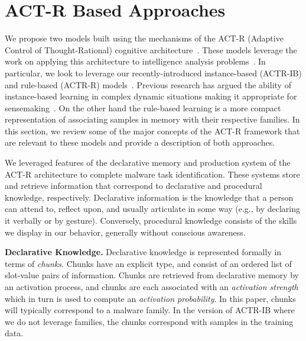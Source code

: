 \documentclass[conference]{IEEEtran}
\begin{document}
\section{ACT-R Based Approaches}
\label{apprSec}

We propose two models built using the mechanisms of the ACT-R (Adaptive Control of Thought-Rational) cognitive architecture~\cite{Anderson04anintegrated}.  These models leverage the work on applying this architecture to intelligence analysis problems~\cite{Lebiere:2013}.  In particular, we look to leverage our recently-introduced instance-based (ACTR-IB) and rule-based (ACTR-R) models~\cite{iccm:2015,brims}.  Previous research has argued the ability of instance-based learning in complex dynamic situations making it appropriate for sensemaking~\cite{Gonzalez2003591}. On the other hand the rule-based learning is a more compact representation of associating samples in memory with their respective families.  In this section, we review some of the major concepts of the ACT-R framework that are relevant to these models and provide a description of both approaches. 

We leveraged features of the declarative memory and production system of the ACT-R architecture to complete malware task identification. These systems store and retrieve information that correspond to declarative and procedural knowledge, respectively. Declarative information is the knowledge that a person can attend to, reflect upon, and usually articulate in some way (e.g., by declaring it verbally or by gesture). Conversely, procedural knowledge consists of the skills we display in our behavior, generally without conscious awareness. 

\noindent\textbf{Declarative Knowledge.}  Declarative knowledge is represented formally in terms of \textit{chunks}. Chunks have an explicit type, and consist of an ordered list of slot-value pairs of information.  Chunks are retrieved from declarative memory by an activation process, and chunks are each associated with an \textit{activation strength} which in turn is used to compute an \textit{activation probability}.  In this paper, chunks will typically correspond to a malware family.  In the version of ACTR-IB where we do not leverage families, the chunks correspond with samples in the training data. 
\end{document}
